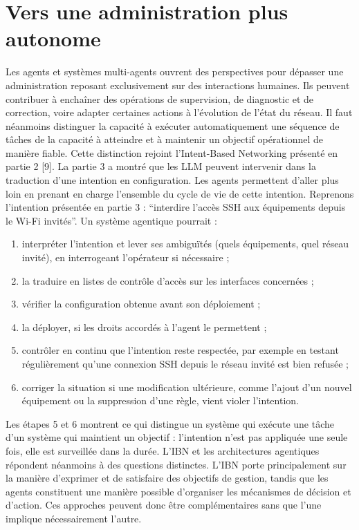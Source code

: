 \section{Vers une administration plus autonome}
Les agents et systèmes multi-agents ouvrent des perspectives pour dépasser une administration reposant exclusivement sur des interactions humaines. Ils peuvent contribuer à enchaîner des opérations de supervision, de diagnostic et de correction, voire adapter certaines actions à l'évolution de l'état du réseau. Il faut néanmoins distinguer la capacité à exécuter automatiquement une séquence de tâches de la capacité à atteindre et à maintenir un objectif opérationnel de manière fiable. 
Cette distinction rejoint l'Intent-Based Networking présenté en partie 2 [9]. La partie 3 a montré que les LLM peuvent intervenir dans la traduction d'une intention en configuration. Les agents permettent d'aller plus loin en prenant en charge l'ensemble du cycle de vie de cette intention.
Reprenons l'intention présentée en partie 3 : “interdire l'accès SSH aux équipements depuis le Wi-Fi invités”. Un système agentique pourrait :
\begin{enumerate}
    \item interpréter l'intention et lever ses ambiguïtés (quels équipements, quel réseau invité), en interrogeant l'opérateur si nécessaire ;
    \item la traduire en listes de contrôle d'accès sur les interfaces concernées ;
    \item vérifier la configuration obtenue avant son déploiement ;
    \item la déployer, si les droits accordés à l'agent le permettent ;
    \item contrôler en continu que l'intention reste respectée, par exemple en testant régulièrement qu'une connexion SSH depuis le réseau invité est bien refusée ;
    \item corriger la situation si une modification ultérieure, comme l'ajout d'un nouvel équipement ou la suppression d'une règle, vient violer l'intention.
\end{enumerate}
Les étapes 5 et 6 montrent ce qui distingue un système qui exécute une tâche d'un système qui maintient un objectif : l'intention n'est pas appliquée une seule fois, elle est surveillée dans la durée.
L'IBN et les architectures agentiques répondent néanmoins à des questions distinctes. L'IBN porte principalement sur la manière d'exprimer et de satisfaire des objectifs de gestion, tandis que les agents constituent une manière possible d'organiser les mécanismes de décision et d'action. Ces approches peuvent donc être complémentaires sans que l'une implique nécessairement l'autre.
